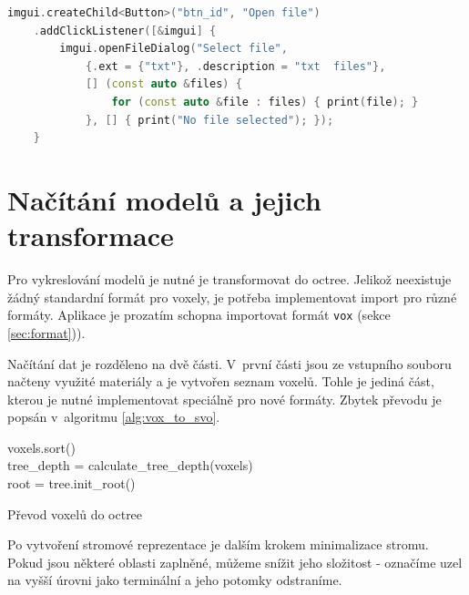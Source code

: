 \begin{lstlisting}[language=C++, caption={Vytvoření tlačítka pro výběr souboru}]
imgui.createChild<Button>("btn_id", "Open file")
    .addClickListener([&imgui] {
        imgui.openFileDialog("Select file", 
            {.ext = {"txt"}, .description = "txt  files"}, 
            [] (const auto &files) {
                for (const auto &file : files) { print(file); }
            }, [] { print("No file selected"); });
    }
\end{lstlisting}


\section{Načítání modelů a jejich transformace} \label{sec:voxel_conversion}
Pro vykreslování modelů je nutné je transformovat do octree. Jelikož neexistuje žádný standardní formát pro voxely, je potřeba implementovat import pro různé formáty. Aplikace je prozatím schopna importovat formát \texttt{vox} (sekce \ref{sec:format})).

Načítání dat je rozděleno na dvě části. V~první části jsou ze vstupního souboru načteny využité materiály a je vytvořen seznam voxelů. Tohle je jediná část, kterou je nutné implementovat speciálně pro nové formáty. Zbytek převodu je popsán v~algoritmu \ref{alg:vox_to_svo}.


\begin{center}
	\begin{czechalgorithm}[H] \label{alg:vox_to_svo}
		voxels.sort() \\
		tree\_depth = calculate\_tree\_depth(voxels)\\
		root = tree.init\_root()\\
		\caption{Převod voxelů do octree}
	\end{czechalgorithm}
\end{center}

Po vytvoření stromové reprezentace je dalším krokem minimalizace stromu. Pokud jsou některé oblasti zaplněné, můžeme snížit jeho složitost - označíme uzel na vyšší úrovni jako terminální a jeho potomky odstraníme.

